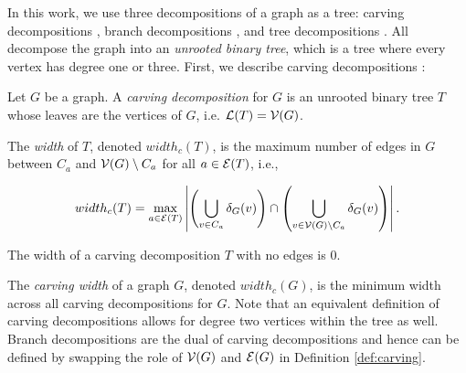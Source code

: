 In this work, we use three decompositions of a graph as a tree: carving decompositions \cite{ST94}, branch decompositions \cite{RS91}, and tree decompositions \cite{RS91}. All decompose the graph into an \emph{unrooted binary tree}, which is a tree where every vertex has degree one or three. First, we describe carving decompositions \cite{ST94}:
\begin{definition}
\label{def:carving}
	Let $G$ be a graph. A \emph{carving decomposition} for $G$ is an unrooted binary tree $T$ whose leaves are the vertices of $G$, i.e. $\mathcal{L}(T) = \mathcal{V}(G)$. 
	
	The \emph{width} of $T$, denoted $width_c(T)$, is the maximum number of edges in $G$ between $C_a$ and $\mathcal{V}(G) \setminus C_a$ for all $a \in \mathcal{E}(T)$, i.e.,
    
	$$width_c(T) = \max_{a \in \mathcal{E}(T)} \left| \left( \bigcup_{v \in C_a} \delta_{G}(v) \right) \cap \left( \bigcup_{v \in \mathcal{V}(G) \setminus C_a} \delta_{G}(v) \right) \right|.$$
	
	
	
	
    The width of a carving decomposition $T$ with no edges is 0.
\end{definition}

The \emph{carving width} of a graph $G$, denoted $width_c(G)$, is the minimum width across all carving decompositions for $G$. Note that an equivalent definition of carving decompositions allows for degree two vertices within the tree as well. 
Branch decompositions are the dual of carving decompositions and hence can be defined by swapping the role of $\mathcal{V}(G)$ and $\mathcal{E}(G)$ in Definition \ref{def:carving}.

